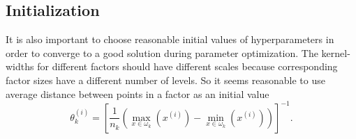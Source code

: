 \subsection{Initialization}
\label{sec:tensor_gp_init}
It is also important to choose reasonable initial values of hyperparameters
in order to converge to a good solution during parameter optimization.
The kernel-widths for different factors should have different scales because
corresponding factor sizes have a different number of levels.
So it seems reasonable to use average distance between points in a factor as an initial value
\begin{equation}
  \label{eq:initialization}
  \theta_k^{(i)} = \left [ \frac{1}{n_k} \left ( \max\limits_{x \in \omega_k}(x^{(i)}) - \min\limits_{x \in \omega_k}(x^{(i)}) \right ) \right ]^{-1}.
\end{equation}

